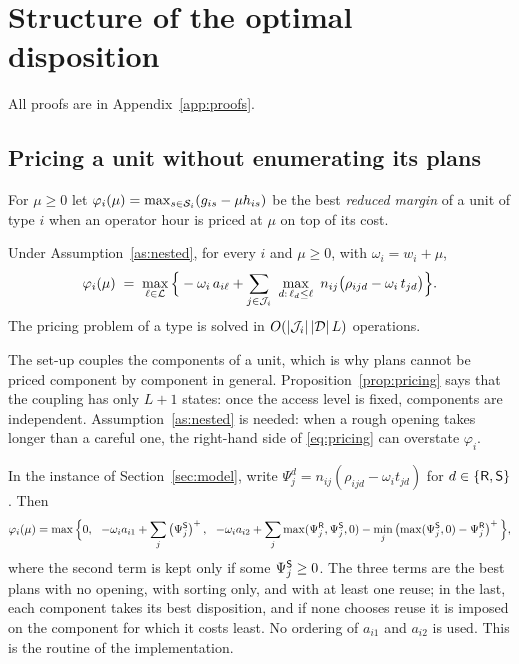 \section{Structure of the optimal disposition}\label{sec:structure}

All proofs are in Appendix~\ref{app:proofs}.

\subsection{Pricing a unit without enumerating its plans}

For $\mu\ge 0$ let $\varphi_i(\mu)=\max_{s\in\mathcal{S}_i}(g_{is}-\mu h_{is})$ be the best \emph{reduced margin} of a unit
of type $i$ when an operator hour is priced at $\mu$ on top of its cost.

\begin{proposition}\label{prop:pricing}
Under Assumption~\ref{as:nested}, for every $i$ and $\mu\ge0$, with $\omega_i=w_i+\mu$,
\begin{equation}\label{eq:pricing}
\varphi_i(\mu)\;=\;\max_{\ell\in\cL}\Big\{-\omega_i\,a_{i\ell}+\sum_{j\in\cJ_i}\ \max_{d:\,\ell_d\le\ell}\
n_{ij}\big(\rho_{ijd}-\omega_i\,t_{jd}\big)\Big\}.
\end{equation}
The pricing problem of a type is solved in $O(|\mathcal{J}_i|\,|\mathcal{D}|\,L)$ operations.
\end{proposition}

The set-up couples the components of a unit, which is why plans cannot be priced component by component in general.
Proposition~\ref{prop:pricing} says that the coupling has only $L+1$ states: once the access level is fixed,
components are independent. Assumption~\ref{as:nested} is needed: when a rough opening takes longer than a careful
one, the right-hand side of \eqref{eq:pricing} can overstate $\varphi_i$.

\begin{remark}\label{rem:twolevel}
In the instance of Section~\ref{sec:model}, write $\Psi^{d}_j=n_{ij}(\rho_{ijd}-\omega_it_{jd})$ for
$d\in\{\mathsf{R},\mathsf{S}\}$. Then
\[
\varphi_i(\mu)=\max\Big\{0,\ \ -\omega_ia_{i1}+\sum_j\pos{\Psi^{\Sd}_j},\ \
-\omega_ia_{i2}+\sum_j\max(\Psi^{\R}_j,\Psi^{\Sd}_j,0)-\min_j\pos{\max(\Psi^{\Sd}_j,0)-\Psi^{\R}_j}\Big\},
\]
where the second term is kept only if some $\Psi^{\mathsf{S}}_j\ge0$. The three terms are the best plans with no opening,
with sorting only, and with at least one reuse; in the last, each component takes its best disposition, and if none
chooses reuse it is imposed on the component for which it costs least. No ordering of $a_{i1}$ and $a_{i2}$ is
used. This is the routine of the implementation.
\end{remark}

